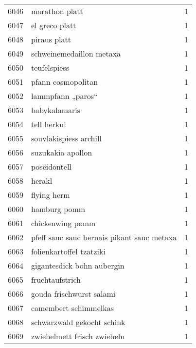 \begin{tabular}{llr}
6046 &                                     marathon platt &      1 \\
6047 &                                     el greco platt &      1 \\
6048 &                                       piraus platt &      1 \\
6049 &                           schweinemedaillon metaxa &      1 \\
6050 &                                       teufelspiess &      1 \\
6051 &                                 pfann cosmopolitan &      1 \\
6052 &                                  lammpfann „paros“ &      1 \\
6053 &                                      babykalamaris &      1 \\
6054 &                                        tell herkul &      1 \\
6055 &                             souvlakispiess archill &      1 \\
6056 &                                  suzukakia apollon &      1 \\
6057 &                                       poseidontell &      1 \\
6058 &                                             herakl &      1 \\
6059 &                                        flying herm &      1 \\
6060 &                                       hamburg pomm &      1 \\
6061 &                                   chickenwing pomm &      1 \\
6062 &         pfeff sauc sauc bernais pikant sauc metaxa &      1 \\
6063 &                           folienkartoffel tzatziki &      1 \\
6064 &                         gigantesdick bohn aubergin &      1 \\
6065 &                                    fruchtaufstrich &      1 \\
6066 &                           gouda frischwurst salami &      1 \\
6067 &                              camembert schimmelkas &      1 \\
6068 &                         schwarzwald gekocht schink &      1 \\
6069 &                        zwiebelmett frisch zwiebeln &      1 \\

\end{tabular}

